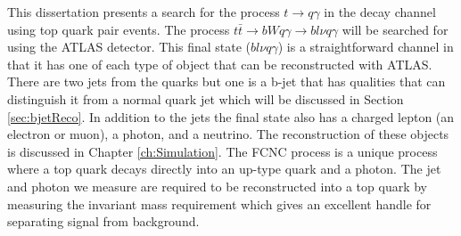 This dissertation presents a search for the process $t\rightarrow q \gamma$ in the decay channel using top quark pair events.  The process $t\bar{t} \rightarrow bWq\gamma \rightarrow bl\nu q\gamma$ will be searched for using the ATLAS detector.  This final state ($b l \nu q \gamma$) is a straightforward channel in that it has one of each type of object that can be reconstructed with ATLAS.  There are two jets from the quarks but one is a b-jet that has qualities that can distinguish it from a normal quark jet which will be discussed in Section \ref{sec:bjetReco}.  In addition to the jets the final state also has a charged lepton (an electron or muon), a photon, and a neutrino.  The reconstruction of these objects is discussed in Chapter \ref{ch:Simulation}.  The FCNC process is a unique process where a top quark decays directly into an up-type quark and a photon.  The jet and photon we measure are required to be reconstructed into a top quark by measuring the invariant mass requirement which gives an excellent handle for separating signal from background.






%

%


